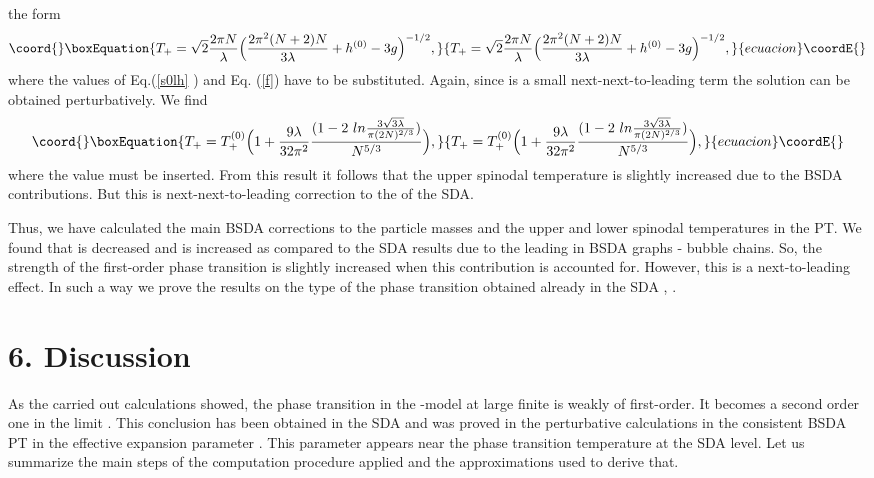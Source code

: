 \documentclass[a4paper,12pt]{article}
\begin{document}
the form
\begin{equation}\coord{}\boxEquation{ \label{t+}
T_+ = \sqrt{2} \frac{2\pi N}{\lambda} \Bigl( \frac{2 \pi^2 (N + 2)
  N}{3 \lambda } + h^{(0)} - 3 g \Bigr)^{- 1/2},
}{ T_+ = \sqrt{2} \frac{2\pi N}{\lambda} \Bigl( \frac{2 \pi^2 (N + 2)
  N}{3 \lambda } + h^{(0)} - 3 g \Bigr)^{- 1/2},
}{ecuacion}\coordE{}\end{equation}
where the values of \coordHE{} Eq.(\ref{s0lh} ) and \coordHE{} Eq. (\ref{f})
have to be substituted. Again, since \coordHE{} is a small
next-next-to-leading term the solution can be obtained
perturbatively. We find
\begin{equation}\coord{}\boxEquation{ \label{t+1}
T_+ = T_+^{(0)} \Bigl( 1 + \frac{9 \lambda}{32 \pi^2} \frac{ ( 1 - 2~
ln \frac{3 \sqrt{3\lambda} }{\pi (2N)^{2/3}})}{N^{5/3}}\Bigr) ,
}{ T_+ = T_+^{(0)} \Bigl( 1 + \frac{9 \lambda}{32 \pi^2} \frac{ ( 1 - 2~
ln \frac{3 \sqrt{3\lambda} }{\pi (2N)^{2/3}})}{N^{5/3}}\Bigr) ,
}{ecuacion}\coordE{}\end{equation}
where the value \coordHE{} must be inserted. From this result it follows
that the upper spinodal temperature is slightly increased due to the
BSDA contributions. But this is next-next-to-leading correction to the
\coordHE{} of the SDA.

Thus, we have calculated the main BSDA corrections to the particle
masses and the upper and lower spinodal temperatures in the
\coordHE{} PT. We found that \coordHE{} is decreased and \coordHE{}
is increased as compared to the SDA results due to the leading in
\coordHE{} BSDA graphs - bubble chains. So, the strength of the
first-order phase transition is slightly increased when this
contribution is accounted for. However, this is a next-to-leading
effect. In such a way we prove the results on the type of the phase
transition obtained already in the SDA \cite{prd}, \cite{pl}.

\section*{6. Discussion}

As the carried out calculations showed, the phase transition in the
\coordHE{}-model at large finite \coordHE{} is weakly of first-order. It becomes
a second order one in the limit \coordHE{}. This conclusion has
been obtained in the SDA and was proved in the perturbative
calculations in the consistent BSDA PT in the effective expansion
parameter \coordHE{}. This parameter appears
near the phase transition temperature \coordHE{} at the SDA level. Let us
summarize the main steps of the computation procedure applied and the
approximations used to derive that.
\end{document}
